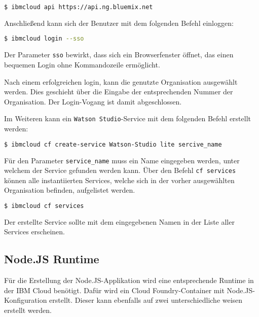 \begin{lstlisting}[language=bash, caption=Setzen des API Targets, label=Setzen des API Targets]
    $ ibmcloud api https://api.ng.bluemix.net
\end{lstlisting}

Anschließend kann sich der Benutzer mit dem folgenden Befehl einloggen:

\begin{lstlisting}[language=bash, caption=Login über CLI und Single Sign-on, label=Login über CLI und SSO]
    $ ibmcloud login --sso
\end{lstlisting}

Der Parameter \texttt{sso} bewirkt, dass sich ein Browserfenster öffnet, das einen bequemen Login ohne Kommandozeile
ermöglicht.

Nach einem erfolgreichen login, kann die genutzte Organisation ausgewählt werden. Dies geschieht über die Eingabe der
entsprechenden Nummer der Organisation. Der Login-Vogang ist damit abgeschlossen.

Im Weiteren kann ein \texttt{Watson Studio}-Service mit dem folgenden Befehl erstellt werden:

\begin{lstlisting}[language=bash, caption=Instanziierung des Watson Studio Services, label=Instanziierung des Watson Studio Services]
    $ ibmcloud cf create-service Watson-Studio lite sercive_name
\end{lstlisting}

Für den Parameter \texttt{service\_name} muss ein Name eingegeben werden, unter welchem der Service gefunden werden kann.
Über den Befehl \texttt{cf services} können alle instantiierten Services, welche sich in der vorher ausgewählten Organisation
befinden, aufgelistet werden.

\begin{lstlisting}[language=bash, caption=Auflisten aller Services, label=Auflisten aller Services]
    $ ibmcloud cf services
\end{lstlisting}

Der erstellte Service sollte mit dem eingegebenen Namen in der Liste aller Services erscheinen.

\subsection{Node.JS Runtime}
\label{ssc:nodejs_runtime}
Für die Erstellung der Node.JS-Applikation wird eine entsprechende Runtime in der IBM Cloud benötigt. Dafür wird ein
Cloud Foundry-Container mit Node.JS-Konfiguration erstellt. Dieser kann ebenfalls auf zwei unterschiedliche weisen erstellt
werden.

